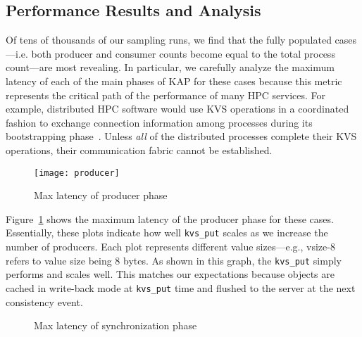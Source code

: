 \subsection{Performance Results and Analysis}
\label{results}
Of tens of thousands of our sampling runs, we find that the fully populated
cases---i.e. both producer and consumer counts become equal to the total
process count---are most revealing. In particular, we carefully analyze 
the maximum latency of each of the main phases of KAP for these cases 
because this metric represents the critical path of the performance of
many HPC services. For example, distributed 
HPC software would use KVS operations in a coordinated fashion to exchange 
connection information among processes during its bootstrapping 
phase~\cite{LIBI,PMI2}. Unless {\em all} 
of the distributed processes complete their
KVS operations, their communication fabric cannot be established. 

\begin{figure}
  \centering
  \texttt{[image: producer]}
  \caption{Max latency of producer phase}
  \vspace{-.5cm}	
  \label{fig:prod}
\end{figure}

Figure~\ref{fig:prod} shows the maximum latency of the producer phase
for these cases. Essentially, these plots indicate how well {\tt kvs\_put}
scales as we increase the number of producers. Each plot represents
different value sizes---e.g., vsize-8 refers to value size being
8 bytes. As shown in this graph, the {\tt kvs\_put} simply performs and
scales well. This matches our expectations because objects
are cached in write-back mode at {\tt kvs\_put} time and flushed to the
server at the next consistency event. 

\ifcomments
{}
\fi

\begin{figure}[ht]
\centering
\begin{subfigure}[With unique values]{
  \texttt{[image: sync]}
  \label{fig:sync:noredund}
}%
\end{subfigure}
\begin{subfigure}[With redundant values]{
  \texttt{[image: sync]}
  \label{fig:sync:redund}
}%
\end{subfigure}
\caption{Max latency of synchronization phase}
\label{fig:sync}
\end{figure}


